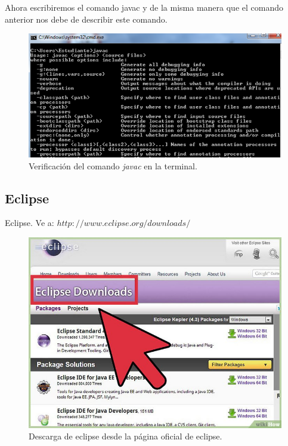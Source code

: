 Ahora escribiremos el comando javac y de la misma
manera que el comando anterior nos debe de describir este comando.\\     

\begin{figure}[H]
	\begin{center}
		\includegraphics[scale=.4]{images/instalaciones/java/img_java_16}
		\caption{Verificación del comando \textit{javac} en la terminal.}
	\end{center}
\end{figure}

\subsection{Eclipse} 
Eclipse. Ve a: $http://www.eclipse.org/downloads/ $

\begin{figure}[H]
	\begin{center}
		\includegraphics[scale=.4]{images/instalaciones/eclipse/img_eclipse_1}
		\caption{Descarga de eclipse desde la página oficial de eclipse.}
	\end{center}
\end{figure}

